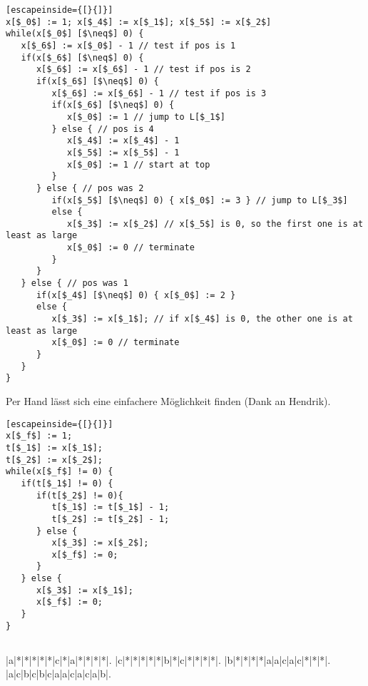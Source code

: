 \documentclass{article}
\begin{document}
\begin{lstlisting}[escapeinside={[}{]}]
x[$_0$] := 1; x[$_4$] := x[$_1$]; x[$_5$] := x[$_2$]
while(x[$_0$] [$\neq$] 0) {
   x[$_6$] := x[$_0$] - 1 // test if pos is 1
   if(x[$_6$] [$\neq$] 0) {
      x[$_6$] := x[$_6$] - 1 // test if pos is 2
      if(x[$_6$] [$\neq$] 0) {
         x[$_6$] := x[$_6$] - 1 // test if pos is 3
         if(x[$_6$] [$\neq$] 0) {
            x[$_0$] := 1 // jump to L[$_1$]
         } else { // pos is 4
            x[$_4$] := x[$_4$] - 1
            x[$_5$] := x[$_5$] - 1
            x[$_0$] := 1 // start at top
         }
      } else { // pos was 2
         if(x[$_5$] [$\neq$] 0) { x[$_0$] := 3 } // jump to L[$_3$]
         else {
            x[$_3$] := x[$_2$] // x[$_5$] is 0, so the first one is at least as large
            x[$_0$] := 0 // terminate
         }
      }
   } else { // pos was 1
      if(x[$_4$] [$\neq$] 0) { x[$_0$] := 2 } 
      else {
         x[$_3$] := x[$_1$]; // if x[$_4$] is 0, the other one is at least as large
         x[$_0$] := 0 // terminate
      }
   }
}
\end{lstlisting}

Per Hand lässt sich eine einfachere Möglichkeit finden (Dank an Hendrik).

\begin{lstlisting}[escapeinside={[}{]}]
x[$_f$] := 1;
t[$_1$] := x[$_1$];
t[$_2$] := x[$_2$];
while(x[$_f$] != 0) {
   if(t[$_1$] != 0) {
      if(t[$_2$] != 0){
         t[$_1$] := t[$_1$] - 1;
         t[$_2$] := t[$_2$] - 1;
      } else {
         x[$_3$] := x[$_2$];
         x[$_f$] := 0;
      }
   } else {
      x[$_3$] := x[$_1$];
      x[$_f$] := 0;
   }
}
\end{lstlisting}

\subsection{} 

\subsection{} 

\begin{minipage}{.4\textwidth}
   \def\PuzzleSolutionContent#1{\makebox(1,1){\itshape{#1}}}
   \renewcommand{\PuzzleLineThickness}{1pt}
   \PuzzleSolution
   \begin{Puzzle}{4}{13}
   |a|*|*|*|*|*|c|*|a|*|*|*|*|.
   |c|*|*|*|*|*|b|*|c|*|*|*|*|.
   |b|*|*|*|*|a|a|c|a|c|*|*|*|.
   |a|c|b|c|b|c|a|a|c|a|c|a|b|.
   \end{Puzzle}
\end{minipage}
\end{document}
